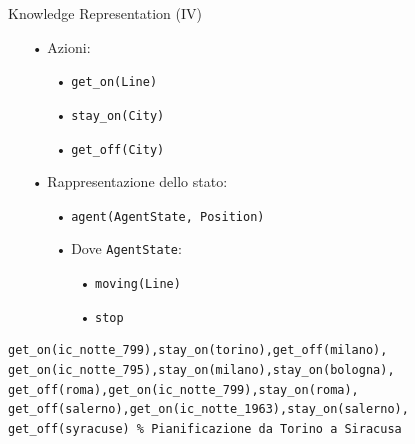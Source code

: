 \documentclass{beamer}
\begin{document}
    \begin{frame}[fragile]{Knowledge Representation (IV)}

        \begin{itemize}

            \item[•] Azioni:

            \begin{itemize}
                \item[•] {\tt get\_on(Line)}
                \item[•] {\tt stay\_on(City)}
                \item[•] {\tt get\_off(City)}
            \end{itemize}

            \item[•] Rappresentazione dello stato:

            \begin{itemize}
                \item[•] {\tt agent(AgentState, Position)}
                \item[•] Dove {\tt AgentState}:
                    \begin{itemize}
                        \item[•] {\tt moving(Line)}
                        \item[•] {\tt stop}
                    \end{itemize}
            \end{itemize}

        \end{itemize}

        \begin{lstlisting}[frame=single, basicstyle=\ttfamily\scriptsize]
get_on(ic_notte_799),stay_on(torino),get_off(milano),
get_on(ic_notte_795),stay_on(milano),stay_on(bologna),
get_off(roma),get_on(ic_notte_799),stay_on(roma),
get_off(salerno),get_on(ic_notte_1963),stay_on(salerno),
get_off(syracuse) % Pianificazione da Torino a Siracusa
\end{lstlisting}


    \end{frame}
\end{document}
